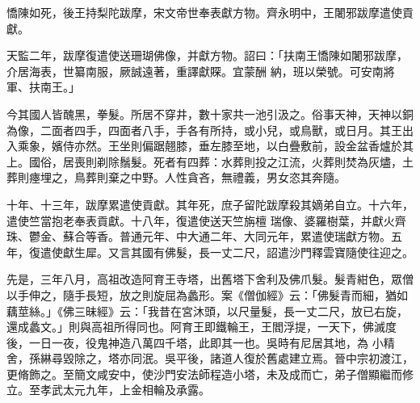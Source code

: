 \begin{pinyinscope}
 憍陳如死，後王持梨陀跋摩，宋文帝世奉表獻方物。齊永明中，王闍邪跋摩遣使貢獻。



 天監二年，跋摩復遣使送珊瑚佛像，并獻方物。詔曰：「扶南王憍陳如闍邪跋摩，介居海表，世纂南服，厥誠遠著，重譯獻賝。宜蒙酬
 納，班以榮號。可安南將軍、扶南王。」



 今其國人皆醜黑，拳髮。所居不穿井，數十家共一池引汲之。俗事天神，天神以銅為像，二面者四手，四面者八手，手各有所持，或小兒，或鳥獸，或日月。其王出入乘象，嬪侍亦然。王坐則偏踞翹膝，垂左膝至地，以白疊敷前，設金盆香爐於其上。國俗，居喪則剃除鬚髮。死者有四葬：水葬則投之江流，火葬則焚為灰燼，土葬則瘞埋之，鳥葬則棄之中野。人性貪吝，無禮義，男女恣其奔隨。



 十年、十三年，跋摩累遣使貢獻。其年死，庶子留陀跋摩殺其嫡弟自立。十六年，遣使竺當抱老奉表貢獻。十八年，復遣使送天竺旃檀
 瑞像、婆羅樹葉，并獻火齊珠、鬱金、蘇合等香。普通元年、中大通二年、大同元年，累遣使瑞獻方物。五年，復遣使獻生犀。又言其國有佛髮，長一丈二尺，詔遣沙門釋雲寶隨使往迎之。



 先是，三年八月，高祖改造阿育王寺塔，出舊塔下舍利及佛爪髮。髮青紺色，眾僧以手伸之，隨手長短，放之則旋屈為蠡形。案《僧伽經》云：「佛髮青而細，猶如藕莖絲。」《佛三昧經》云：「我昔在宮沐頭，以尺量髮，長一丈二尺，放已右旋，還成蠡文。」則與高祖所得同也。阿育王即鐵輪王，王閻浮提，一天下，佛滅度後，一日一夜，役鬼神造八萬四千塔，此即其一也。吳時有尼居其地，為
 小精舍，孫綝尋毀除之，塔亦同泯。吳平後，諸道人復於舊處建立焉。晉中宗初渡江，更脩飾之。至簡文咸安中，使沙門安法師程造小塔，未及成而亡，弟子僧顯繼而修立。至孝武太元九年，上金相輪及承露。




\end{pinyinscope}
